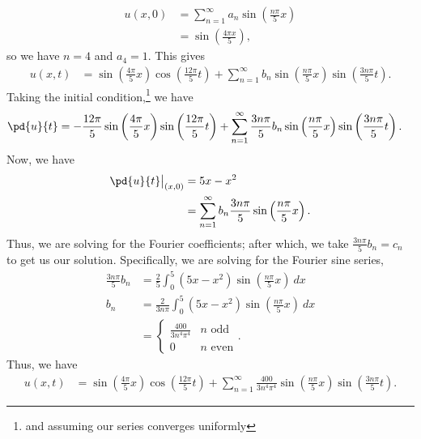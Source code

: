 \documentclass[10pt]{mypackage}
\begin{document}
\begin{example}
  \begin{align*}
    u\left( x,0 \right) &= \sum_{n=1}^{\infty}a_n\sin\left( \frac{n\pi }{5}x \right)\\
                        &= \sin\left( \frac{4\pi x}{5} \right),
  \end{align*}
  so we have $n =4$ and $a_4=1$. This gives
  \begin{align*}
    u\left( x,t \right) &= \sin\left( \frac{4\pi }{5} x\right)\cos\left( \frac{12\pi}{5}t \right) + \sum_{n=1}^{\infty}b_n\sin\left( \frac{n\pi}{5}x \right)\sin\left( \frac{3n\pi}{5}t \right).
  \end{align*}
  Taking the initial condition,\footnote{and assuming our series converges uniformly} we have
  \begin{align*}
    \pd{u}{t} &= -\frac{12 \pi}{5}\sin\left( \frac{4\pi}{5}x \right)\sin\left( \frac{12\pi}{5}t \right) + \sum_{n=1}^{\infty}\frac{3n\pi}{5}b_n\sin\left( \frac{n\pi}{5}x \right)\sin\left( \frac{3n\pi}{5}t \right).
  \end{align*}
  Now, we have
  \begin{align*}
    \pd{u}{t}\bigr\vert_{(x,0)} &= 5x-x^2\\
                                &= \sum_{n=1}^{\infty}b_n\frac{3n\pi }{5}\sin\left( \frac{n\pi }{5}x \right).
  \end{align*}
  Thus, we are solving for the Fourier coefficients; after which, we take $\frac{3n\pi}{5}b_n = c_n$ to get us our solution. Specifically, we are solving for the Fourier sine series,
  \begin{align*}
    \frac{3n\pi}{5}b_n &= \frac{2}{5} \int_{0}^{5} \left( 5x-x^2 \right)\sin\left( \frac{n\pi}{5}x \right)\:dx\\
    b_n &= \frac{2}{3n\pi}\int_{0}^{5} \left( 5x-x^2 \right)\sin\left( \frac{n\pi}{5}x \right)\:dx\\
        &= \begin{cases}
          \frac{400}{3n^4\pi^4} & \text{$n$ odd}\\
          0 & \text{$n$ even}
        \end{cases}.
  \end{align*}
  Thus, we have
  \begin{align*}
    u\left( x,t \right) &= \sin\left( \frac{4\pi }{5}x \right)\cos\left( \frac{12 \pi}{5}t \right) + \sum_{n=1}^{\infty}\frac{400}{3n^4\pi^4}\sin\left( \frac{n\pi}{5}x \right)\sin\left( \frac{3n\pi}{5}t \right).
  \end{align*}
\end{example}
\end{document}
